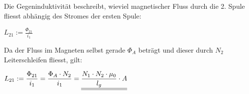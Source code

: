 \newpage


\beginbsp

Die Gegeninduktivität beschreibt, wieviel magnetischer Fluss durch die 2. Spule fliesst abhängig des Stromes der ersten Spule:
\begin{center}
$\displaystyle L_{21} := \frac{\Phi_{21}}{i_1}$
\end{center}

Da der Fluss im Magneten selbst gerade $\Phi_A$ beträgt und dieser durch $N_2$ Leiterschleifen fliesst, gilt:
\begin{center}

	$\displaystyle  L_{21} := \frac{\Phi_{21}}{i_1} = \frac{\Phi_A \cdot N_2}{i_1} = \underline{\underline{\frac{N_1\cdot N_2 \cdot \mu_0}{l_g} \cdot A}}$
\end{center}
\iend







